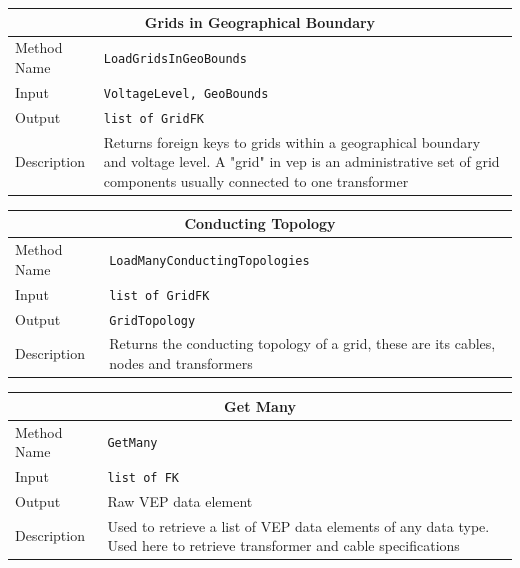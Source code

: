 \vspace{.5cm}

\begin{tabular}{ l  p{12cm}} 
    \hline
    \multicolumn{2}{c}{\textbf{Grids in Geographical Boundary}}\\
    \hline
    Method Name     & \texttt{LoadGridsInGeoBounds} \\
    Input           & \texttt{VoltageLevel, GeoBounds}\\
    Output          & \texttt{list of GridFK}\\
    Description     & Returns foreign keys to grids within a geographical boundary and voltage level. A "grid" in vep is an administrative set of grid components usually connected to one transformer\\
\end{tabular}

\vspace{.5cm}

\begin{tabular}{ l  p{12cm}} 
    \hline
    \multicolumn{2}{c}{\textbf{Conducting Topology}}\\
    \hline
    Method Name     & \texttt{LoadManyConductingTopologies} \\
    Input           & \texttt{list of GridFK}\\
    Output          & \texttt{GridTopology} \\
    Description     & Returns the conducting topology of a grid, these are its cables, nodes and transformers\\
\end{tabular}

\vspace{.5cm}

\begin{tabular}{ l  p{12cm}} 
    \hline
    \multicolumn{2}{c}{\textbf{Get Many}}\\
    \hline
    Method Name     & \texttt{GetMany} \\
    Input           & \texttt{list of FK}\\
    Output          & Raw VEP data element \\
    Description     & Used to retrieve a list of VEP data elements of any data type. Used here to retrieve transformer and cable specifications\\
\end{tabular}

\vspace{.5cm}


